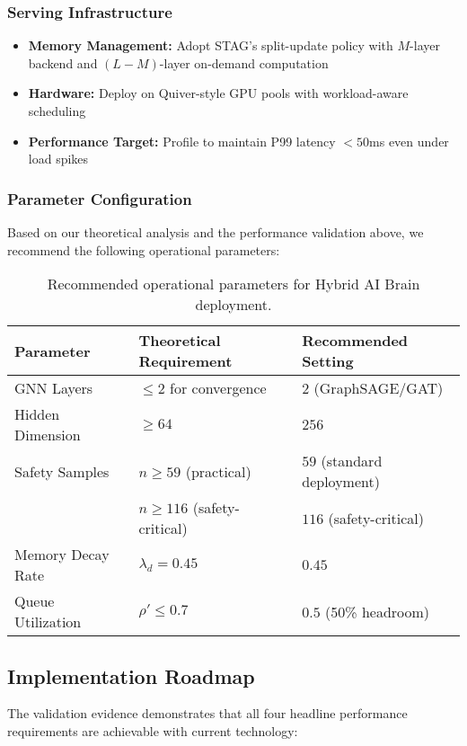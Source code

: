 \documentclass{article}
\begin{document}
\subsubsection{Serving Infrastructure}
\begin{itemize}
    \item \textbf{Memory Management:} Adopt STAG's split-update policy with $M$-layer backend and $(L-M)$-layer on-demand computation
    \item \textbf{Hardware:} Deploy on Quiver-style GPU pools with workload-aware scheduling
    \item \textbf{Performance Target:} Profile to maintain P99 latency $< 50$ms even under load spikes
\end{itemize}

\subsubsection{Parameter Configuration}

Based on our theoretical analysis and the performance validation above, we recommend the following operational parameters:

\begin{table}[H]
\centering
\caption{Recommended operational parameters for Hybrid AI Brain deployment.}
\begin{tabular}{|l|l|l|}
\hline
\textbf{Parameter} & \textbf{Theoretical Requirement} & \textbf{Recommended Setting} \\
\hline
GNN Layers & $\leq 2$ for convergence & $2$ (GraphSAGE/GAT) \\
Hidden Dimension & $\geq 64$ & $256$ \\
Safety Samples & $n \geq 59$ (practical) & $59$ (standard deployment) \\
& $n \geq 116$ (safety-critical) & $116$ (safety-critical) \\
Memory Decay Rate & $\lambda_d = 0.45$ & $0.45$ \\
Queue Utilization & $\rho' \leq 0.7$ & $0.5$ (50\% headroom) \\
\hline
\end{tabular}
\label{tab:operational_params}
\end{table}

\subsection{Implementation Roadmap}

The validation evidence demonstrates that all four headline performance requirements are achievable with current technology:
\end{document}
